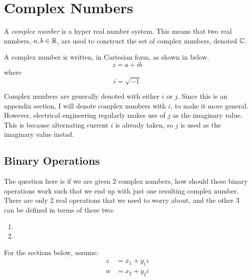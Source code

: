 \section{Complex Numbers}\label{sec:Complex_Numbers}
\begin{definition}\label{def:Complex_Number}
  A \emph{complex number} is a hyper real number system.
  This means that two real numbers, $a, b \in \operatorname{\mathbb{R}}$, are used to construct the set of complex numbers, denoted $\operatorname{\mathbb{C}}$.

  A complex number is written, in Cartesian form, as shown in  below.
  \begin{equation}\label{eq:Complex_Number}
    z = a + ib
  \end{equation}
  where
  \begin{equation}\label{eq:Imaginary_Value}
    i = \sqrt{-1}
  \end{equation}

  \begin{remark*}
    Complex numbers are generally denoted with either $i$ or $j$.
    Since this is an appendix section, I will denote complex numbers with $i$, to make it more general.
    However, electrical engineering regularly makes use of $j$ as the imaginary value.
    This is because alternating current $i$ is already taken, so $j$ is used as the imaginary value instad.
  \end{remark*}
\end{definition}

\subsection{Binary Operations}\label{subsec:Binary_Operations}
The question here is if we are given 2 complex numbers, how should these binary operations work such that we end up with just one resulting complex number.
There are only 2 real operations that we need to worry about, and the other 3 can be defined in terms of these two:
\begin{enumerate}[noitemsep]
\item {}
\item {}
\end{enumerate}

For the sections below, assume:
\begin{align*}
  z &= x_{1} + y_{1}i \\
  w &= x_{2} + y_{2}i
\end{align*}

